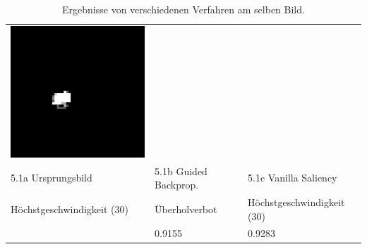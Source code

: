 \begin{table}
\begin{tabular}{p{4.5cm}p{4.5cm}p{4.5cm}}
		\includegraphics[width=\linewidth]{Images/AnPe/10771_vanil}\\ 
		5.1a Ursprungsbild &5.1b Guided Backprop. &5.1c Vanilla Saliency \\
		Höchstgeschwindigkeit (30) & Überholverbot & Höchstgeschwindigkeit (30)\\
		& 0.9155 & 0.9283\\
		
	\end{tabular} 

	\caption{Ergebnisse von verschiedenen Verfahren am selben Bild. }
	\label{tab:sal1}
\end{table}


